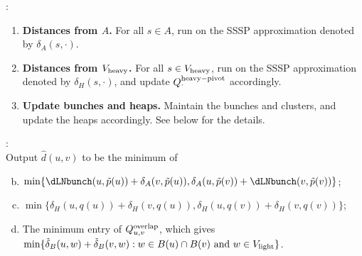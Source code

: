 \noindent{}:
\begin{enumerate}[(1)]
     \item \textbf{Distances from $A$.} For all $s\in A$, run  on the SSSP approximation denoted by $\delta_A(s,\cdot)$. %
    \item \textbf{Distances from $V_{\rm{heavy}}$.} For all $s\in V_{\rm{heavy}}$, run  on the SSSP approximation denoted by $\delta_H(s,\cdot)$, and update $Q^{\rm{heavy-pivot}}_{\cdot}$ accordingly. 
    \item \textbf{Update bunches and heaps.} Maintain the bunches and clusters, and update the heaps accordingly. See below for the details.  \label{step:update3_moved}
\end{enumerate}

\noindent{}:\\
    Output $\hat d(u, v)$ to be the minimum of 
    \begin{enumerate}[(a)]\setcounter{enumi}{1}
         \item $\min\{ \dLNbunch(u,\tilde p(u))+\delta_A(v,\tilde p(u)),\delta_A(u,\tilde p(v))+\dLNbunch(v,\tilde p(v))\}$;\label{step:pivotW}
        \item $\min\{ \delta_H(u,q(u))+\delta_H(v,q(u)),\delta_H(u,q(v))+\delta_H(v,q(v))\}$;\label{step:quvitW}
        \item The minimum entry of $Q^{\rm{overlap}}_{u,v}$, which gives $\min\{\tilde \delta_B(u,w)+\tilde \delta_B(v,w) : w\in B(u)\cap B(v) \text{ and }w\in V_{\rm{light}}\}$. \label{step:w_light} 
    \end{enumerate}
    
